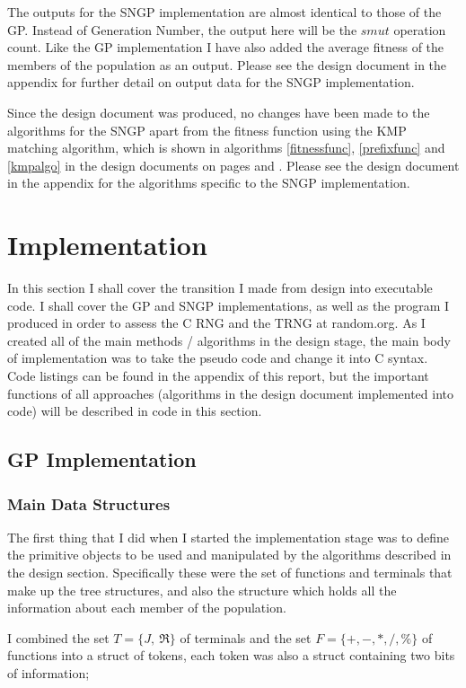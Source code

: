 \documentclass[a4paper,10.5pt]{article}
\begin{document}
The outputs for the SNGP implementation are almost identical to those of the GP. Instead of Generation Number, the output here will be the $smut$ operation count. Like the GP implementation I have also added the average fitness of the members of the population as an output. Please see the design document in the appendix for further detail on output data for the SNGP implementation.

Since the design document was produced, no changes have been made to the algorithms for the SNGP apart from the fitness function using the KMP matching algorithm, which is shown in algorithms \ref{fitnessfunc}, \ref{prefixfunc} and \ref{kmpalgo} in the design documents on pages \pageref{kmpalgo} and \pageref{fitnessfunc}. Please see the design document in the appendix for the algorithms specific to the SNGP implementation.

\newpage
\section{Implementation}
In this section I shall cover the transition I made from design into executable code. I shall cover the GP and SNGP implementations, as well as the program I produced in order to assess the C RNG and the TRNG at random.org. As I created all of the main methods / algorithms in the design stage, the main body of implementation was to take the pseudo code and change it into C syntax. Code listings can be found in the appendix of this report, but the important functions of all approaches (algorithms in the design document implemented into code) will be described in code in this section.

\subsection{GP Implementation}

\subsubsection{Main Data Structures}
The first thing that I did when I started the implementation stage was to define the primitive objects to be used and manipulated by the algorithms described in the design section. Specifically these were the set of functions and terminals that make up the tree structures, and also the structure which holds all the information about each member of the population.

I combined the set $T = \{J,\ \Re\}$ of terminals and the set $F = \{+, -, *, /, \%\}$ of functions into a struct of tokens, each token was also a struct containing two bits of information;
\end{document}
